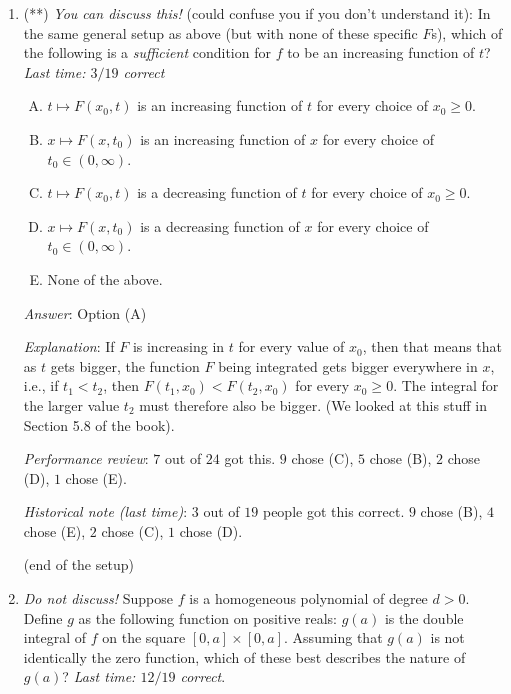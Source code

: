 \documentclass[10pt]{amsart}
\begin{document}
\begin{enumerate}
  {\em Performance review}: $14$ out of $24$ got this, $7$ chose (B),
  $2$ chose (E), $1$ chose (C).

  {\em Historical note (last time)}: $7$ out of $19$ people got this
  correct. $7$ people chose (E), $2$ each chose (A) and (B), and $1$
  chose (C).

\item (**) {\em You can discuss this!} (could confuse you if you don't
  understand it): In the same general setup as above (but with none of
  these specific $F$s), which of the following is a {\em sufficient}
  condition for $f$ to be an increasing function of $t$? {\em Last
  time: $3/19$ correct}

  \begin{enumerate}[(A)]
  \item $t \mapsto F(x_0,t)$ is an increasing function of $t$ for
    every choice of $x_0 \ge 0$.
  \item $x \mapsto F(x,t_0)$ is an increasing function of $x$ for
    every choice of $t_0 \in (0,\infty)$.
  \item $t \mapsto F(x_0,t)$ is a decreasing function of $t$ for
    every choice of $x_0 \ge 0$.
  \item $x \mapsto F(x,t_0)$ is a decreasing function of $x$ for
  every choice of $t_0 \in (0,\infty)$.
  \item None of the above.
  \end{enumerate}

  {\em Answer}: Option (A)

  {\em Explanation}: If $F$ is increasing in $t$ for every value of
  $x_0$, then that means that as $t$ gets bigger, the function $F$
  being integrated gets bigger everywhere in $x$, i.e., if $t_1 <
  t_2$, then $F(t_1,x_0) < F(t_2,x_0)$ for every $x_0 \ge 0$. The
  integral for the larger value $t_2$ must therefore also be
  bigger. (We looked at this stuff in Section 5.8 of the book).

  {\em Performance review}: $7$ out of $24$ got this. $9$ chose (C),
  $5$ chose (B), $2$ chose (D), $1$ chose (E).

  {\em Historical note (last time)}: $3$ out of $19$ people got this
  correct. $9$ chose (B), $4$ chose (E), $2$ chose (C), $1$ chose (D).

  (end of the setup)

  \vspace{0.3in}

\item {\em Do not discuss!} Suppose $f$ is a homogeneous polynomial of
  degree $d > 0$. Define $g$ as the following function on positive
  reals: $g(a)$ is the double integral of $f$ on the square $[0,a]
  \times [0,a]$. Assuming that $g(a)$ is not identically the zero
  function, which of these best describes the nature of $g(a)$? {\em
  Last time: $12/19$ correct}.


\end{enumerate}
\end{document}
